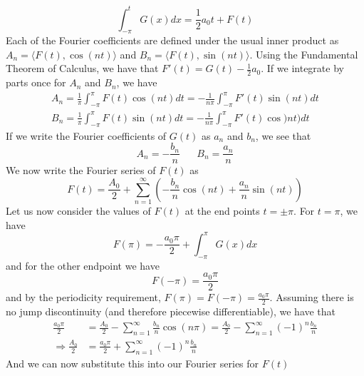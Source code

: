 \documentclass{report}
\theoremstyle{definition}
\theoremstyle{remark}
\newcommand{\twen}{\hspace{20pt}}
\begin{document}
\begin{equation*}
    \int^t_{-\pi} G(x)dx = \frac{1}{2}a_0t+F(t)
\end{equation*}
Each of the Fourier coefficients are defined under the usual inner product as $A_n = \langle F(t),\cos(nt)\rangle$ and $B_n=\langle F(t),\sin(nt)\rangle$. Using the Fundamental Theorem of Calculus, we have that $F'(t)=G(t)-\frac{1}{2}a_0$. If we integrate by parts once for $A_n$ and $B_n$, we have 
\begin{equation*}
    \begin{split}
        A_n = \frac{1}{\pi}\int^\pi_{-\pi}F(t)\cos (nt)dt =-\frac{1}{n\pi}\int^\pi_{-\pi}F'(t)\sin(nt)dt \\
        B_n=\frac{1}{\pi}\int^\pi_{-\pi}F(t)\sin (nt)dt=-\frac{1}{n\pi}\int^\pi_{-\pi}F'(t)\cos)nt)dt
    \end{split}
\end{equation*}
If we write the Fourier coefficients of $G(t)$ as $a_n $ and $b_n$, we see that 
\begin{equation*}
    A_n=-\frac{b_n}{n} \twen B_n=\frac{a_n}{n}
\end{equation*}
We now write the Fourier series of $F(t)$ as 
\begin{equation*}
    F(t)=\frac{A_0}{2}+\sum^\infty_{n=1}\left(-\frac{b_n}{n}\cos(nt)+\frac{a_n}{n}\sin(nt) \right)
\end{equation*}
Let us now consider the values of $F(t)$ at the end points $t=\pm \pi$. For $t=\pi$, we have 
\begin{equation*}
    F(\pi)=-\frac{a_0\pi}{2} +\int^\pi_{-\pi}G(x)dx
\end{equation*}
and for the other endpoint we have 
\begin{equation*}
    F(-\pi)=\frac{a_0\pi}{2}
\end{equation*}
and by the periodicity requirement, $F(\pi)=F(-\pi)=\frac{a_0\pi}{2}$. Assuming there is no jump discontinuity (and therefore piecewise differentiable), we have that 
\begin{equation*}
    \begin{split}
        \frac{a_0\pi}{2} &= \frac{A_0}{2}-\sum^\infty_{n=1}\frac{b_n}{n}\cos(n\pi) = \frac{A_0}{2}-\sum^\infty_{n=1}(-1)^n\frac{b_n}{n} \\
        \Rightarrow\frac{A_0}{2}&=\frac{a_0\pi}{2}+\sum^\infty_{n=1}(-1)^n\frac{b_n}{n}
    \end{split}
\end{equation*}
And we can now substitute this into our Fourier series for $F(t)$
\end{document}
